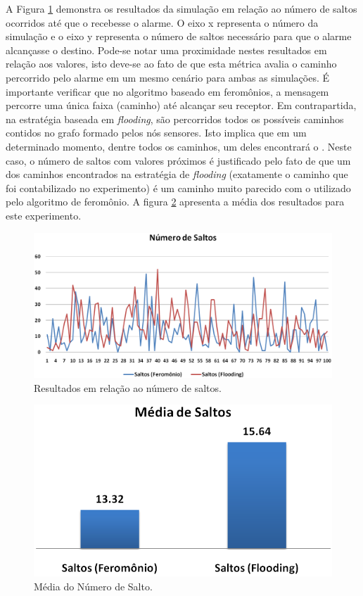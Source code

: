  A Figura \ref{fig:hops} demonstra os resultados da simulação em relação ao número de saltos ocorridos até que o \vant recebesse o alarme. O eixo x representa o número da simulação e o eixo y representa o número de saltos necessário para que o alarme alcançasse o destino. Pode-se notar uma proximidade nestes resultados em relação aos valores, isto deve-se ao fato de que esta métrica avalia o caminho percorrido pelo alarme em um mesmo cenário para ambas as simulações. É importante verificar que no algoritmo baseado em feromônios, a mensagem percorre uma única faixa (caminho) até alcançar seu receptor. Em contrapartida, na estratégia baseada em \emph{flooding}, são percorridos todos os possíveis caminhos contidos no grafo formado pelos nós sensores. Isto implica que em um determinado momento, dentre todos os caminhos, um deles encontrará o \vant. Neste caso, o número de saltos com valores próximos é justificado pelo fato de que um dos caminhos encontrados na estratégia de \emph{flooding} (exatamente o caminho que foi contabilizado no experimento) é um caminho muito parecido com o utilizado pelo algoritmo de feromônio. A figura \ref{fig:hops_mean} apresenta a média dos resultados para este experimento.


 \begin{figure}[h!]
 \centering
 \includegraphics[width=13cm]{results/hops.png}
 \caption{Resultados em relação ao número de saltos.}
  \label{fig:hops}
 \end{figure}


 \begin{figure}[h!]
 \centering
 \includegraphics{results/hops_mean.png}
 \caption{Média do Número de Salto.}
  \label{fig:hops_mean}
 \end{figure}

